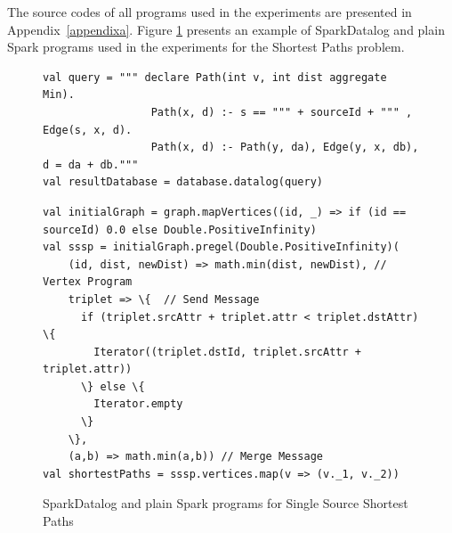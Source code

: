The source codes of all programs used in the experiments are presented in Appendix~\ref{appendixa}. Figure \ref{sourcecodesample} presents an example of SparkDatalog and plain Spark programs used in the experiments for the Shortest Paths problem.

\begin{figure}
\begin{Verbatim}[label=Shortest paths - SparkDatalog]
val query = """ declare Path(int v, int dist aggregate Min).
                 Path(x, d) :- s == """ + sourceId + """ , Edge(s, x, d).
                 Path(x, d) :- Path(y, da), Edge(y, x, db), d = da + db."""
val resultDatabase = database.datalog(query)
\end{Verbatim}

\vspace{0cm}

\begin{Verbatim}[label=Shortest paths - Spark]
val initialGraph = graph.mapVertices((id, _) => if (id == sourceId) 0.0 else Double.PositiveInfinity)
val sssp = initialGraph.pregel(Double.PositiveInfinity)(
    (id, dist, newDist) => math.min(dist, newDist), // Vertex Program
    triplet => \{  // Send Message
      if (triplet.srcAttr + triplet.attr < triplet.dstAttr) \{
        Iterator((triplet.dstId, triplet.srcAttr + triplet.attr))
      \} else \{
        Iterator.empty
      \}
    \},
    (a,b) => math.min(a,b)) // Merge Message
val shortestPaths = sssp.vertices.map(v => (v._1, v._2))
\end{Verbatim}
\caption{SparkDatalog and plain Spark programs for Single Source Shortest Paths\label{sourcecodesample}}
\end{figure}

